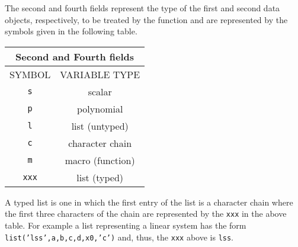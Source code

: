 The second
and fourth fields represent the type of the first and second data objects,
respectively, 
to be treated by the function and are represented by the symbols given
in the following table.

\begin{center}
\begin{tabular}{|c|c|}
\hline  
\multicolumn{2}{|c|}{Second and Fourth fields}
\\ \hline \hline
SYMBOL & VARIABLE TYPE
\\ \hline \hline

\verb!s! & scalar  \\ \hline

\verb!p! & polynomial \\ \hline

\verb!l! & list (untyped)  \\ \hline

\verb!c! & character chain   \\ \hline

\verb!m! & macro (function) \\ \hline

\verb!xxx! & list (typed)  \\ \hline 
\end{tabular}
\end{center}

A typed list is one in which the first
entry of the list is a character chain where the first
three characters of the chain are represented by the 
{\tt xxx} in the above table.  For example a list
representing a linear system has the form 
{\tt list('lss',a,b,c,d,x0,'c')} and, thus, the {\tt xxx}
above is {\tt lss}.

